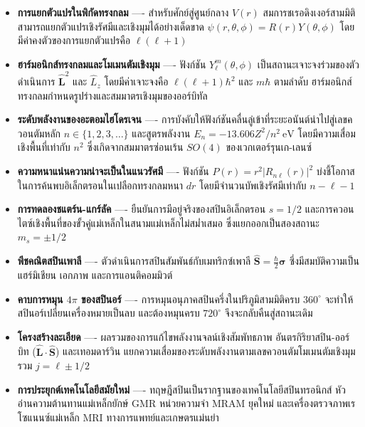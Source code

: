 \begin{itemize}
    \item \textbf{การแยกตัวแปรในพิกัดทรงกลม} ---- สำหรับศักย์สู่ศูนย์กลาง $V(r)$ สมการชเรอดิงเงอร์สามมิติสามารถแยกตัวแปรเชิงรัศมีและเชิงมุมได้อย่างเด็ดขาด $\psi(r, \theta, \phi) = R(r)Y(\theta, \phi)$ โดยมีค่าคงตัวของการแยกตัวแปรคือ $\ell(\ell+1)$
    \item \textbf{ฮาร์มอนิกส์ทรงกลมและโมเมนตัมเชิงมุม} ---- ฟังก์ชัน $Y_\ell^m(\theta, \phi)$ เป็นสถานะเจาะจงร่วมของตัวดำเนินการ $\hat{\mathbf{L}}^2$ และ $\hat{L}_z$ โดยมีค่าเจาะจงคือ $\ell(\ell+1)\hbar^2$ และ $m\hbar$ ตามลำดับ ฮาร์มอนิกส์ทรงกลมกำหนดรูปร่างและสมมาตรเชิงมุมของออร์บิทัล
    \item \textbf{ระดับพลังงานของอะตอมไฮโดรเจน} ---- การบังคับให้ฟังก์ชันคลื่นลู่เข้าที่ระยะอนันต์นำไปสู่เลขควอนตัมหลัก $n \in \{1, 2, 3, \dots\}$ และสูตรพลังงาน $E_n = -13.606 Z^2/n^2~\text{eV}$ โดยมีความเสื่อมเชิงพื้นที่เท่ากับ $n^2$ ซึ่งเกิดจากสมมาตรซ่อนเร้น $SO(4)$ ของเวกเตอร์รุนเก-เลนซ์
    \item \textbf{ความหนาแน่นความน่าจะเป็นในแนวรัศมี} ---- ฟังก์ชัน $P(r) = r^2 |R_{n\ell}(r)|^2$ บ่งชี้โอกาสในการค้นพบอิเล็กตรอนในเปลือกทรงกลมหนา $dr$ โดยมีจำนวนบัพเชิงรัศมีเท่ากับ $n - \ell - 1$
    \item \textbf{การทดลองชแตร์น-แกร์ลัค} ---- ยืนยันการมีอยู่จริงของสปินอิเล็กตรอน $s = 1/2$ และการควอนไตซ์เชิงพื้นที่ของขั้วคู่แม่เหล็กในสนามแม่เหล็กไม่สม่ำเสมอ ซึ่งแยกออกเป็นสองสถานะ $m_s = \pm 1/2$
    \item \textbf{พีชคณิตสปินเพาลี} ---- ตัวดำเนินการสปินสัมพันธ์กับเมทริกซ์เพาลี $\hat{\mathbf{S}} = \frac{\hbar}{2}\boldsymbol{\sigma}$ ซึ่งมีสมบัติความเป็นแฮร์มิเชียน เอกภาพ และการแอนติคอมมิวต์
    \item \textbf{คาบการหมุน $4\pi$ ของสปินอร์} ---- การหมุนอนุภาคสปินครึ่งในปริภูมิสามมิติครบ $360^\circ$ จะทำให้สปินอร์เปลี่ยนเครื่องหมายเป็นลบ และต้องหมุนครบ $720^\circ$ จึงจะกลับคืนสู่สถานะเดิม
    \item \textbf{โครงสร้างละเอียด} ---- ผลรวมของการแก้ไขพลังงานจลน์เชิงสัมพัทธภาพ อันตรกิริยาสปิน-ออร์บิท ($\hat{\mathbf{L}}\cdot\hat{\mathbf{S}}$) และเทอมดาร์วิน แยกความเสื่อมของระดับพลังงานตามเลขควอนตัมโมเมนตัมเชิงมุมรวม $j = \ell \pm 1/2$
    \item \textbf{การประยุกต์เทคโนโลยีสมัยใหม่} ---- ทฤษฎีสปินเป็นรากฐานของเทคโนโลยีสปินทรอนิกส์ หัวอ่านความต้านทานแม่เหล็กยักษ์ GMR หน่วยความจำ MRAM ยุคใหม่ และเครื่องตรวจภาพเรโซแนนซ์แม่เหล็ก MRI ทางการแพทย์และเกษตรแม่นยำ
\end{itemize}

